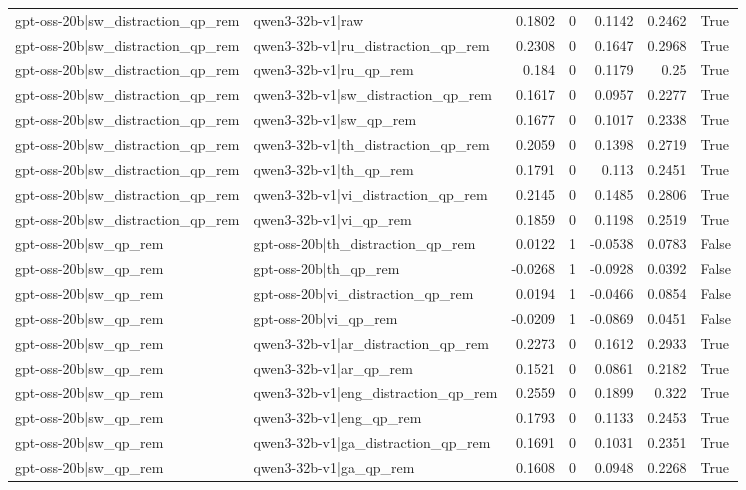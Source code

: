 \begin{table}
\begin{tabular}{l l r r r r l}
gpt-oss-20b|sw_distraction_qp_rem & qwen3-32b-v1|raw & 0.1802 & 0 & 0.1142 & 0.2462 & True \\
gpt-oss-20b|sw_distraction_qp_rem & qwen3-32b-v1|ru_distraction_qp_rem & 0.2308 & 0 & 0.1647 & 0.2968 & True \\
gpt-oss-20b|sw_distraction_qp_rem & qwen3-32b-v1|ru_qp_rem & 0.184 & 0 & 0.1179 & 0.25 & True \\
gpt-oss-20b|sw_distraction_qp_rem & qwen3-32b-v1|sw_distraction_qp_rem & 0.1617 & 0 & 0.0957 & 0.2277 & True \\
gpt-oss-20b|sw_distraction_qp_rem & qwen3-32b-v1|sw_qp_rem & 0.1677 & 0 & 0.1017 & 0.2338 & True \\
gpt-oss-20b|sw_distraction_qp_rem & qwen3-32b-v1|th_distraction_qp_rem & 0.2059 & 0 & 0.1398 & 0.2719 & True \\
gpt-oss-20b|sw_distraction_qp_rem & qwen3-32b-v1|th_qp_rem & 0.1791 & 0 & 0.113 & 0.2451 & True \\
gpt-oss-20b|sw_distraction_qp_rem & qwen3-32b-v1|vi_distraction_qp_rem & 0.2145 & 0 & 0.1485 & 0.2806 & True \\
gpt-oss-20b|sw_distraction_qp_rem & qwen3-32b-v1|vi_qp_rem & 0.1859 & 0 & 0.1198 & 0.2519 & True \\
gpt-oss-20b|sw_qp_rem & gpt-oss-20b|th_distraction_qp_rem & 0.0122 & 1 & -0.0538 & 0.0783 & False \\
gpt-oss-20b|sw_qp_rem & gpt-oss-20b|th_qp_rem & -0.0268 & 1 & -0.0928 & 0.0392 & False \\
gpt-oss-20b|sw_qp_rem & gpt-oss-20b|vi_distraction_qp_rem & 0.0194 & 1 & -0.0466 & 0.0854 & False \\
gpt-oss-20b|sw_qp_rem & gpt-oss-20b|vi_qp_rem & -0.0209 & 1 & -0.0869 & 0.0451 & False \\
gpt-oss-20b|sw_qp_rem & qwen3-32b-v1|ar_distraction_qp_rem & 0.2273 & 0 & 0.1612 & 0.2933 & True \\
gpt-oss-20b|sw_qp_rem & qwen3-32b-v1|ar_qp_rem & 0.1521 & 0 & 0.0861 & 0.2182 & True \\
gpt-oss-20b|sw_qp_rem & qwen3-32b-v1|eng_distraction_qp_rem & 0.2559 & 0 & 0.1899 & 0.322 & True \\
gpt-oss-20b|sw_qp_rem & qwen3-32b-v1|eng_qp_rem & 0.1793 & 0 & 0.1133 & 0.2453 & True \\
gpt-oss-20b|sw_qp_rem & qwen3-32b-v1|ga_distraction_qp_rem & 0.1691 & 0 & 0.1031 & 0.2351 & True \\
gpt-oss-20b|sw_qp_rem & qwen3-32b-v1|ga_qp_rem & 0.1608 & 0 & 0.0948 & 0.2268 & True \\

\end{tabular}
\end{table}
